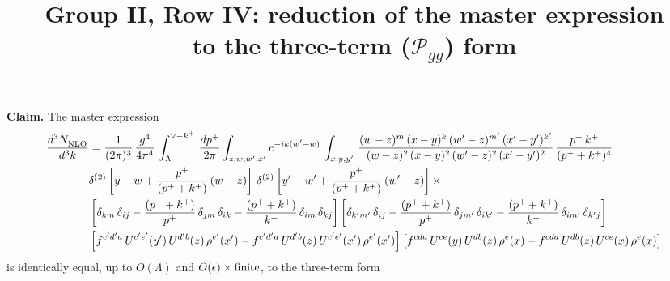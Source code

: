 \documentclass[10pt]{article}
\title{Group II, Row IV: reduction of the master expression\\ to the three-term ($\mathcal P_{gg}$) form}
\author{}
\date{}
\begin{document}
\maketitle
\vspace{-2.5em}

\textbf{Claim.} The master expression
\begin{align}\label{eq:master}
     \frac{d^{3}N_{\rm NLO}^{\rm}}{d^{3}k}  & = \frac{1}{(2\pi)^{3}}\,\frac{g^{4}}{4\pi^{4}}\,\int_{\Lambda}^{\vee-k^{+}}\, \frac{dp^{+}}{2\pi}\int_{z,w,w^{\prime},x'} e^{-ik(w^{\prime}-w)}\,  \int_{x,y,y^{\prime}}\,\frac{(w-z)^{m}\,(x-y)^{k}\,(w'-z)^{m'}\,(x'-y')^{k'}}{(w-z)^{2}\,(x-y)^{2}\,(w'-z)^{2}\,(x'-y')^{2}}\,\frac{p^{+}\,k^{+}}{(p^{+}+k^{+})^{4}}\notag \\ & \delta^{(2)}\left[y-w+\frac{p^{+}}{(p^{+}+k^{+})}\,(w-z)\right]\, \delta^{(2)}\left[y'-w'+\frac{p^{+}}{(p^{+}+k^{+})}\,(w'-z)\right]\times\notag \\ &  \left[\delta_{km}\,\delta_{ij}-\frac{(p^{+}+k^{+})}{p^{+}}\,\delta_{jm}\,\delta_{ik}-\frac{(p^{+}+k^{+})}{k^{+}}\,\delta_{im}\,\delta_{kj}\right] \left[\delta_{k'm'}\,\delta_{ij}-\frac{(p^{+}+k^{+})}{p^{+}}\,\delta_{jm'}\,\delta_{ik'}-\frac{(p^{+}+k^{+})}{k^{+}}\,\delta_{im'}\,\delta_{k'j}\right]\notag \\ & \left[f^{c'd'a}\,U^{c'e'}(y')\,U^{d'b}(z)\,\rho^{e'}(x')-f^{c'd'a}\, U^{d'b}(z)\,U^{c'e'}(x')\,\rho^{e'}(x')\right] \left[f^{cda}\,U^{ce}(y)\,U^{db}(z)\,\rho^{e}(x)-f^{cda}\, U^{db}(z)\,U^{ce}(x)\,\rho^{e}(x)\right]
\end{align}
is identically equal, up to $O(\Lambda)$ and $O(\epsilon)\times{\rm finite}$, to the three-term form
\end{document}
